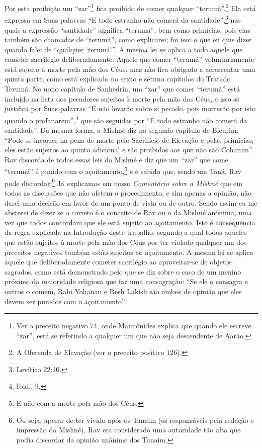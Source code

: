 Por esta proibição um ``zar''\footnote{Ver o preceito negativo 74, onde Maimônides explica que quando ele
  escreve ``zar'', está se referindo a qualquer um que não seja
  descendente de Aarão.} fica proibido de
comer qualquer ``terumá''.\footnote{A Oferenda de Elevação (ver o preceito positivo 126).} Ela está expressa em
Suas palavras ``E todo estranho não comerá
da santidade'',\footnote{Levítico 22:10.} nas quais a expressão ``santidade''
significa ``terumá'', bem como primícias, pois elas também são chamadas
de ``terumá'', como explicarei; foi isso o que eu quis dizer quando
falei de ``qualquer `terumá'''.
A mesma lei se aplica a todo aquele que cometer sacrilégio
deliberadamente.
Aquele que comer ``terumá'' voluntariamente está sujeito à morte
pela mão dos Céus, mas não fica obrigado a acrescentar uma quinta parte,
como está explicado no sexto e sétimo capítulos do Tratado Terumá. No
nono capítulo de Sanhedrin, um ``zar'' que comer ``terumá'' está incluído na
lista dos
pecadores sujeitos à morte pela mão dos Céus, e isso se justifica por
Suas palavras ``E não levarão sobre si pecado, pois morrerão por isto
quando o profanarem'',\footnote{Ibid., 9.} que são seguidas por ``E todo estranho
não comerá da santidade''. Da mesma forma, a Mishné diz no segundo
capítulo de Bicurim: ``Pode-se incorrer na pena de morte pelo Sacrifício de Elevação e pelas primícias; eles
estão sujeitos ao quinto adicional e são proibidos aos que não são
Cohanim''.
Rav discorda de todas essas leis da Mishné e diz que um ``zar'' que
come ``terumá'' é punido com o açoitamento,\footnote{E não com a morte pela mão dos Céus.} e é
sabido que, sendo um Taná, Rav pode discordar.\footnote{Ou seja, apesar de ter vivido após os Tanaim (os responsáveis pela
  redação e impressão da Mishné), Rav era considerado uma autoridade tão
  alta que podia discordar da opinião unânime dos Tanaim.} Já
explicamos em nosso \emph{Comentário sobre a Mishné} que em todas as
discussões que não afetem o procedimento, e sim apenas a opinião, não darei uma decisão em favor de um ponto de vista ou de
outro. Sendo assim eu me absterei de dizer se o correto é o conceito de
Rav ou o da Mishné anônima, uma vez que todos concordam que ele está
sujeito ao açoitamento. Isto é consequência da regra explicada na
Introdução deste trabalho, segundo a qual todos aqueles que estão
sujeitos à morte pela mão dos Céus por ter violado qualquer um dos
preceitos negativos também estão sujeitos ao açoitamento. A mesma lei se
aplica àquele que deliberadamente cometer sacrilégio ao aproveitar-se
de objetos sagrados, como está demonstrado pelo que se diz sobre o caso
de um menino próximo da maioridade religiosa que faz uma consagração:
``Se ele o consagra e outros o comem, Rabi Yohanan e Resh Lakish são
ambos de opinião que eles devem ser punidos com o açoitamento''.

